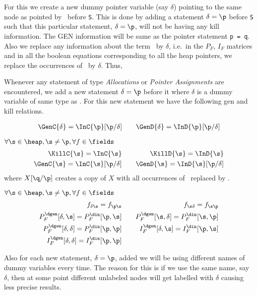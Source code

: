 \begin{enumerate}
{For this we create a new dummy pointer variable (say $\delta$) pointing to the same node as pointed by \p\ before {\tt S}.
This is done by adding a statement $\delta = \p$ before {\tt S} such that this particular statement, $\delta = \p$,  will not be having
any kill information. The GEN information will be same as the pointer statement {\tt p = q}. Also we replace any information about the term 
\p\ by $\delta$, i.e.\ in the $P_F$, $I_F$ matrices and in all the boolean equations corresponding to all the heap pointers, we replace 
the occurrences of \p\ by $\delta$. Thus,

Whenever any statement of type \textit{Allocations} or \textit{Pointer Assignments} are encountered, we add a new statement
$\delta = \p$ before it where $\delta$ is a dummy variable of same type as \p. For this new statement 
we have the following gen and kill relations.

\begin{eqnarray*}
\GenC{\delta}   = \InC{\p}[\p/\delta] &\quad& \GenD{\delta} = \InD{\p}[\p/\delta] \\
\end{eqnarray*}

$\forall \s \in \heap, \s \not= \p, \forall f \in \fields$ 
\begin{eqnarray*}
\KillC{\s}   = \InC{\s}  &\quad& \KillD{\s} = \InD{\s}  \\
\GenC{\s}   = \InC{\s}[\p/\delta] &\quad& \GenD{\s} = \InD{\s}[\p/\delta] \\ 	 
\end{eqnarray*}
{where $X[\q/\p]$ creates a copy of $X$ with all occurrences
  of \q\ replaced by \p.}

$\forall \s \in \heap, \s \not= \p, \forall f \in \fields$ 
\begin{eqnarray*}
f_{\delta\s}                  = f_{\p\s}  			&\quad&  f_{\s\delta} 				= f_{\s\p} \\
P_F^{\dgen}[\delta,\s]        =  P_F^{\din}[\p,\s] 	&\quad&  P_F^{\dgen}[\s,\delta]     =  P_F^{\din}[\s,\p]   \\
P_F^{\dgen}[\delta,\delta]    =  P_F^{\din}[\p,\p]  &\quad&  I_F^{\dgen}[\delta,\s]    	=   I_F^{\din}[\p,\s] \\
I_F^{\dgen}[\delta,\delta]    = I_F^{\din}[\p,\p] 	&\quad& \\
\end{eqnarray*}

Also for each new statement, $\delta = \p$, added we will be using different names of dummy variables every time. The reason for this is 
if we use the same name, say $\delta$, 
then at some point different unlabeled nodes will get labelled with $\delta$ causing less precise results. 
}


\end{enumerate}
